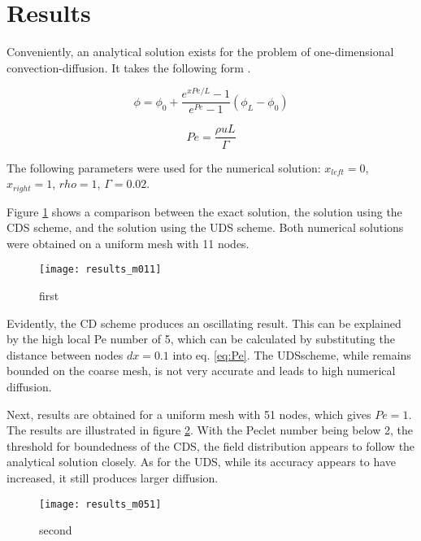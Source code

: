 \documentclass[12pt]{article}
\begin{document}
\section{Results}
\label{sec:results}

Conveniently, an analytical solution exists for the problem of one-dimensional convection-diffusion. It takes the following form \parencite{FerzigerCFD}.

\begin{equation}
    \phi = \phi_0 + \frac{e^{xPe/L} - 1}{e^{Pe} - 1} \left( \phi_L - \phi_0 \right)
    \label{eq:exactSol}
\end{equation}

\begin{equation}
    Pe = \frac{\rho u L}{\Gamma}
    \label{eq:Pe}
\end{equation}

The following parameters were used for the numerical solution: $x_{left} = 0$, $x_{right} = 1$, $rho = 1$, $\Gamma = 0.02$.

Figure \ref{fig:first} shows a comparison between the exact solution, the solution using the CDS scheme, and the solution using the UDS scheme. Both numerical solutions were obtained on a uniform mesh with 11 nodes.

\begin{figure}
    \centering
    \texttt{[image: results\_m011]}
    \caption{first}
    \label{fig:first}
\end{figure}

Evidently, the CD scheme produces an oscillating result. This can be explained by the high local Pe number of 5, which can be calculated by substituting the distance between nodes $dx = 0.1$ into eq. \eqref{eq:Pe}. The UDSscheme, while remains bounded on the coarse mesh, is not very accurate and leads to high numerical diffusion.

Next, results are obtained for a uniform mesh with 51 nodes, which gives $Pe = 1$. The results are illustrated in figure \ref{fig:second}. With the Peclet number being below 2, the threshold for boundedness of the CDS, the field distribution appears to follow the analytical solution closely. As for the UDS, while its accuracy appears to have increased, it still produces larger diffusion.

\begin{figure}
    \centering
    \texttt{[image: results\_m051]}
    \caption{second}
    \label{fig:second}
\end{figure}
\end{document}
